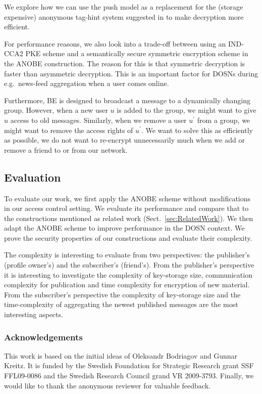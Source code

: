 We explore how we can use the push model as a replacement for the (storage 
expensive) anonymous tag-hint system suggested in \cite{anobe} to make 
decryption more efficient.

For performance reasons, we also look into a trade-off between using an 
IND-CCA2 \ac{PKE} scheme and a semantically secure symmetric encryption scheme 
in the \ac{ANOBE} construction.
The reason for this is that symmetric decryption is faster than asymmetric 
decryption.
This is an important factor for \acp{DOSN} during e.g.~news-feed aggregation 
when a user comes online.

Furthermore, \ac{BE} is designed to broadcast a message to a dynamically 
changing group.
However, when a new user \(u\) is added to the group, we might want to give 
\(u\) access to old messages.
Similarly, when we remove a user \(u^\prime\) from a group, we might want to 
remove the access rights of \(u^\prime\).
We want to solve this as efficiently as possible, we do not want to re-encrypt 
unnecessarily much when we add or remove a friend to or from our network.

\subsection{Evaluation}\label{sec:Evaluation}

To evaluate our work, we first apply the \ac{ANOBE} scheme without 
modifications in our access control setting.
We evaluate its performance and compare that to the constructions mentioned as 
related work (Sect.~\ref{sec:RelatedWork}).
We then adapt the \ac{ANOBE} scheme to improve performance in the \ac{DOSN} 
context.
We prove the security properties of our constructions and evaluate their 
complexity.

The complexity is interesting to evaluate from two perspectives: the 
publisher's (profile owner's) and the subscriber's (friend's).
From the publisher's perspective it is interesting to investigate the 
complexity of key-storage size, communication complexity for publication and 
time complexity for encryption of new material.
From the subscriber's perspective the complexity of key-storage size and the 
time-complexity of aggregating the newest published messages are the most 
interesting aspects.


\subsubsection{Acknowledgements}

This work is based on the initial ideas of Oleksandr Bodriagov and Gunnar 
Kreitz.
It is funded by the Swedish Foundation for Strategic Research grant SSF 
FFL09-0086 and the Swedish Research Council grand VR 2009-3793.
Finally, we would like to thank the anonymous reviewer for valuable feedback.


\printbibliography
